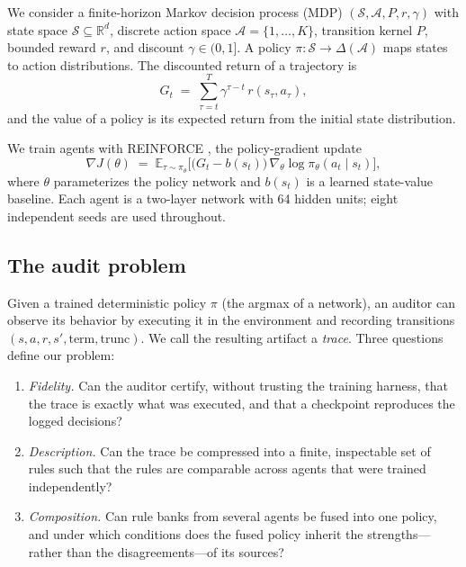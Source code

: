 \documentclass[11pt]{article}
\begin{document}
We consider a finite-horizon Markov decision process (MDP) $(\mathcal{S},\mathcal{A},P,r,\gamma)$
with state space $\mathcal{S}\subseteq\mathbb{R}^{d}$, discrete action space
$\mathcal{A}=\{1,\ldots,K\}$, transition kernel $P$, bounded reward $r$, and discount
$\gamma\in(0,1]$. A policy $\pi\colon \mathcal{S}\to\Delta(\mathcal{A})$ maps states to action
distributions. The discounted return of a trajectory is
\begin{equation}
G_t \;=\; \sum_{\tau=t}^{T} \gamma^{\tau-t}\, r(s_\tau,a_\tau),
\label{eq:return}
\end{equation}
and the value of a policy is its expected return from the initial state distribution.

We train agents with REINFORCE \cite{williams1992simple}, the policy-gradient update
\begin{equation}
\nabla J(\theta) \;=\; \mathbb{E}_{\tau\sim\pi_\theta}\Big[\big(G_t - b(s_t)\big)\,\nabla_\theta \log \pi_\theta(a_t\mid s_t)\Big],
\label{eq:reinforce}
\end{equation}
where $\theta$ parameterizes the policy network and $b(s_t)$ is a learned state-value baseline.
Each agent is a two-layer network with 64 hidden units; eight independent seeds are used throughout.

\subsection{The audit problem}
\label{sec:prelim:audit}

Given a trained deterministic policy $\pi$ (the argmax of a network), an auditor can observe its
behavior by executing it in the environment and recording transitions
$(s,a,r,s',\mathrm{term},\mathrm{trunc})$. We call the resulting artifact a \emph{trace}. Three
questions define our problem:

\begin{enumerate}
  \item \emph{Fidelity.} Can the auditor certify, without trusting the training harness, that the
        trace is exactly what was executed, and that a checkpoint reproduces the logged decisions?
  \item \emph{Description.} Can the trace be compressed into a finite, inspectable set of rules such
        that the rules are comparable across agents that were trained independently?
  \item \emph{Composition.} Can rule banks from several agents be fused into one policy, and under
        which conditions does the fused policy inherit the strengths---rather than the
        disagreements---of its sources?
\end{enumerate}
\end{document}
